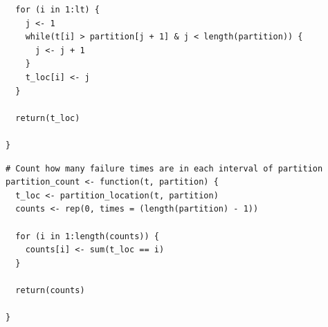 \documentclass[11pt,a4paper]{article}
\begin{document}
\begin{appendices}
\begin{lstlisting}
  for (i in 1:lt) {
    j <- 1
    while(t[i] > partition[j + 1] & j < length(partition)) {
      j <- j + 1
    }
    t_loc[i] <- j
  }

  return(t_loc)

}
\end{lstlisting}

\begin{lstlisting}
# Count how many failure times are in each interval of partition
partition_count <- function(t, partition) {
  t_loc <- partition_location(t, partition)
  counts <- rep(0, times = (length(partition) - 1))

  for (i in 1:length(counts)) {
    counts[i] <- sum(t_loc == i)
  }

  return(counts)

}
\end{lstlisting}

\end{appendices}

\newpage


\end{document}
